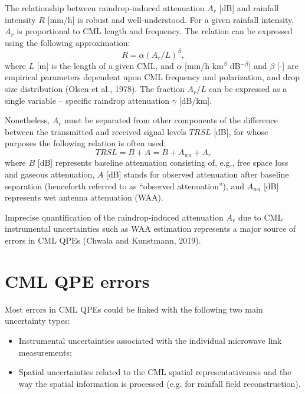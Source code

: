 \documentclass{ctuthesis}\usepackage[]{graphicx}\usepackage[]{color}
\begin{document}
The relationship between raindrop-induced attenuation $A_r$ [dB] and rainfall intensity $R$ [mm/h] is robust and well-understood. For a given rainfall intensity, $A_r$ is proportional to CML length and frequency. The relation can be expressed using the following approximation:
        \begin{equation} \label{eq:2eq1}
        R = \alpha (A_r / L)^\beta,
        \end{equation}
where $L$ [m] is the length of a given CML, and $\alpha$ [mm/h km$^\beta$ dB$^{-\beta}$] and $\beta$ [-] are empirical parameters dependent upon CML frequency and polarization, and drop size distribution (Olsen et al., 1978). The fraction $A_r / L$ can be expressed as a single variable -- specific raindrop attenuation $\gamma$ [dB/km].

Nonetheless, $A_r$ must be separated from other components of the difference between the transmitted and received signal levels $TRSL$ [dB], for whose purposes the following relation is often used: 
        \begin{equation} \label{eq:2eq2}
        TRSL = B + A = B + A_{wa} + A_r
        \end{equation}
where $B$ [dB] represents baseline attenuation consisting of, e.g., free space loss and gaseous attenuation, $A$ [dB] stands for observed attenuation after baseline separation (henceforth referred to as “observed attenuation”), and $A_{wa}$ [dB] represents wet antenna attenuation (WAA).

Imprecise quantification of the raindrop-induced attenuation $A_r$ due to CML instrumental uncertainties such as WAA estimation represents a major source of errors in CML QPEs (Chwala and Kunstmann, 2019).


\section{CML QPE errors}

Most errors in CML QPEs could be linked with the following two main uncertainty types: 
\begin{itemize}
        \item Instrumental uncertainties associated with the individual microwave link measurements; 
        \item Spatial uncertainties related to the CML spatial representativeness and the way the spatial information is processed (e.g. for rainfall field reconstruction).
\end{itemize}
\end{document}
